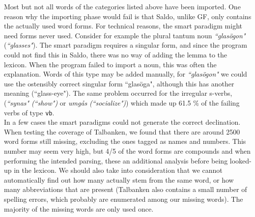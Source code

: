 \documentclass{report}
\begin{document}
%
Most but not all words of the categories listed above have been imported.
One reason why the importing phase would fail 
is that Saldo, unlike GF, only contains the actually used word forms.
For technical reasons, the smart paradigm might need forms never used.
Consider for example
the plural tantum %
noun \emph{``glasögon"} (\emph{``glasses"}).
The smart paradigm requires a singular form, and since the program could not
find this in Saldo, there was no way of adding the lemma to the lexicon. 
When the program failed to import a noun, this was often the explanation.
Words of this type may be added manually, for \emph{``glasögon"} we could use
the ostensibly correct singular form ``glasöga", although this
has another meaning (``glass-eye").
The same problem occurred for the irregular s-verbs,
(\emph{``synas"} \emph{(``show")} or \emph{umgås} \emph{(``socialize")})
which made up 61.5 \% of the failing verbs of type \verb_vb_.\\
In a few cases the smart paradigms could not generate the correct declination.\\


When testing the coverage of Talbanken,
we found that there are around 2500 word forms still missing, excluding the ones
tagged as names and numbers. This number may seem very high, but %
4/5 of the word forms are compounds and when performing the intended parsing,
these an additional analysis before being looked-up in the lexicon. We
should also take into consideration that 
we cannot automatically find out how many actually stem from the same word, or
how many abbreviations that are present (Talbanken also contains a small number of 
spelling errors, which probably are enumerated among our missing words). The majority
of the missing words are only used once.\\
\end{document}
